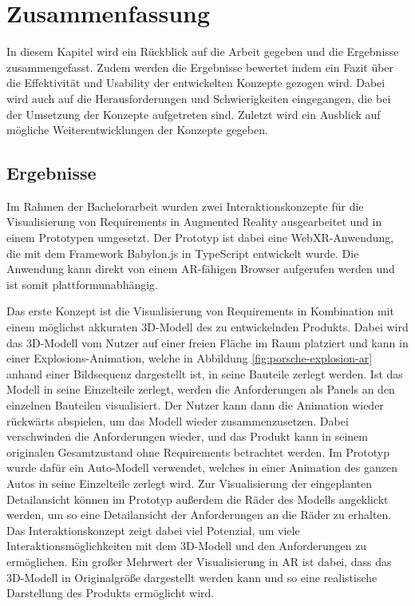 \chapter{Zusammenfassung}

In diesem Kapitel wird ein Rückblick auf die Arbeit gegeben und die Ergebnisse zusammengefasst.
Zudem werden die Ergebnisse bewertet indem ein Fazit über die Effektivität und Usability der entwickelten Konzepte gezogen wird.
Dabei wird auch auf die Herausforderungen und Schwierigkeiten eingegangen, die bei der Umsetzung der Konzepte aufgetreten sind.
Zuletzt wird ein Ausblick auf mögliche Weiterentwicklungen der Konzepte gegeben.

\section{Ergebnisse}

Im Rahmen der Bachelorarbeit wurden zwei Interaktionskonzepte für die Visualisierung von Requirements in Augmented Reality ausgearbeitet und in einem Prototypen umgesetzt.
Der Prototyp ist dabei eine WebXR-Anwendung, die mit dem Framework Babylon.js in TypeScript entwickelt wurde.
Die Anwendung kann direkt von einem AR-fähigen Browser aufgerufen werden und ist somit plattformunabhängig.



Das erste Konzept ist die Visualisierung von Requirements in Kombination mit einem möglichst akkuraten 3D-Modell des zu entwickelnden Produkts.
Dabei wird das 3D-Modell vom Nutzer auf einer freien Fläche im Raum platziert und kann in einer \glqq{}Explosions\grqq{}-Animation, welche in Abbildung \ref{fig:porsche-explosion-ar} anhand einer Bildsequenz dargestellt ist, in seine Bauteile zerlegt werden.
Ist das Modell in seine Einzelteile zerlegt, werden die Anforderungen als Panels an den einzelnen Bauteilen visualisiert.
Der Nutzer kann dann die Animation wieder rückwärts abspielen, um das Modell wieder zusammenzusetzen.
Dabei verschwinden die Anforderungen wieder, und das Produkt kann in seinem originalen Gesamtzustand ohne Requirements betrachtet werden.
Im Prototyp wurde dafür ein Auto-Modell verwendet, welches in einer Animation des ganzen Autos in seine Einzelteile zerlegt wird.
Zur Visualisierung der eingeplanten Detailansicht können im Prototyp außerdem die Räder des Modells angeklickt werden, um so eine Detailansicht der Anforderungen an die Räder zu erhalten.
Das Interaktionskonzept zeigt dabei viel Potenzial, um viele Interaktionsmöglichkeiten mit dem 3D-Modell und den Anforderungen zu ermöglichen.
Ein großer Mehrwert der Visualisierung in AR ist dabei, dass das 3D-Modell in Originalgröße dargestellt werden kann und so eine realistische Darstellung des Produkts ermöglicht wird.

